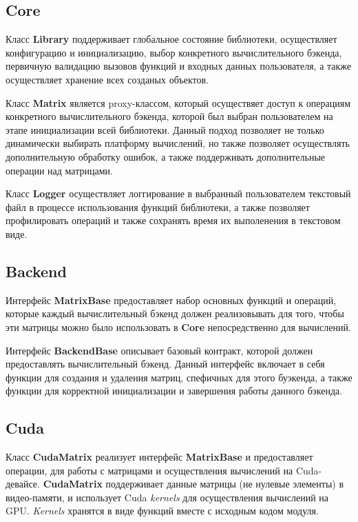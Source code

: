 \subsection*{Core}

Класс \textbf{Library} поддерживает глобальное состояние библиотеки, осуществляет конфигурацию и инициализацию, выбор конкретного вычислительного бэкенда, первичную валидацию вызовов функций и входных данных пользователя, 
а также осуществляет хранение всех созданых объектов. 

Класс \textbf{Matrix} является proxy-классом, который осуществяет доступ к операциям конкретного вычислительного бэкенда, которой был выбран пользователем на этапе инициализации всей библиотеки.
Данный подход позволяет не только динамически выбирать платформу вычислений, 
но также позволяет осуществлять дополнительную обработку ошибок, 
а также поддерживать дополнительные операции над матрицами.

Класс \textbf{Logger} осуществляет логгирование в выбранный пользователем текстовый файл в процессе использования функций библиотеки, а также позволяет профилировать операций и также сохранять время их выполенения в текстовом виде.

\subsection*{Backend}

Интерфейс \textbf{MatrixBase} предоставляет набор основных функций и операций, которые каждый вычислительный бэкенд должен реализовывать для того, чтобы эти матрицы можно было использовать в \textbf{Core} непосредственно для вычислений.

Интерфейс \textbf{BackendBase} описывает базовый контракт, которой должен предоставлять вычислительный бэкенд. Данный интерфейс включает в себя функции для создания и удаления матриц, спефичных для этого буэкенда, а также функции для корректной инициализации и завершения работы данного бэкенда.

\subsection*{Cuda}

Класс \textbf{CudaMatrix} реализует интерфейс \textbf{MatrixBase} и предоставляет операции, для работы с матрицами и осуществления вычислений на Cuda-девайсе. \textbf{CudaMatrix} поддерживает данные матрицы (не нулевые элементы) в видео-памяти, и использует Cuda \textit{kernels} для осуществления вычислений на GPU. \textit{Kernels} хранятся в виде функций вместе с исходным кодом модуля.

